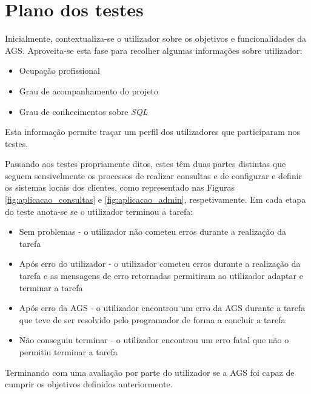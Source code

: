 \documentclass[11pt,twoside,a4paper]{report}
\begin{document}
\section{Plano dos testes}
Inicialmente, contextualiza-se o utilizador sobre os objetivos e funcionalidades da AGS. Aproveita-se esta fase para recolher algumas informações sobre utilizador:
\begin{itemize}
	\item Ocupação profissional
	\item Grau de acompanhamento do projeto
	\item Grau de conhecimentos sobre \textit{SQL}
\end{itemize}
Esta informação permite traçar um perfil dos utilizadores que participaram nos testes.\par 
Passando aos testes propriamente ditos, estes têm duas partes distintas que seguem sensivelmente os processos de realizar consultas e de configurar e definir os sistemas locais dos clientes, como representado nas Figuras \ref{fig:aplicacao_consultas} e \ref{fig:aplicacao_admin}, respetivamente.
Em cada etapa do teste anota-se se o utilizador terminou a tarefa:
\begin{itemize}
	\item Sem problemas - o utilizador não cometeu erros durante a realização da tarefa
	\item Após erro do utilizador - o utilizador cometeu erros durante a realização da tarefa e as mensagens de erro retornadas permitiram ao utilizador adaptar e terminar a tarefa
	\item Após erro da AGS - o utilizador encontrou um erro da AGS durante a tarefa que teve de ser resolvido pelo programador de forma a concluir a tarefa
	\item Não conseguiu terminar - o utilizador encontrou um erro fatal que não o permitiu terminar a tarefa
\end{itemize}
Terminando com uma avaliação por parte do utilizador se a AGS foi capaz de cumprir os objetivos definidos anteriormente.
\end{document}

